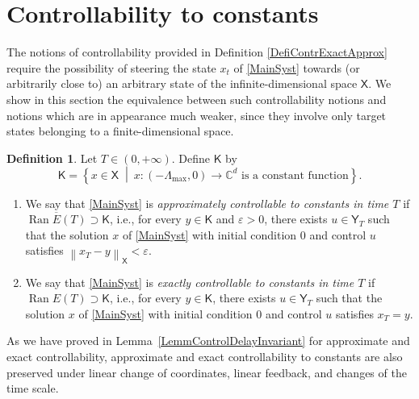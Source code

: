 \documentclass[10pt]{article}
\newcommand{\ie}{i.e.,\xspace}
\theoremstyle{plain}
\theoremstyle{definition}
\newtheorem{defi}[theo]{Definition}
\DeclareMathOperator{\range}{Ran}
\newcommand{\midsuchthat}{\;\middle|\:}
\newcommand{\norm}[1]{\left\lVert #1\right\lVert}
\numberwithin{equation}{section}\numberwithin{figure}{section}\emergencystretch=3em
\begin{document}
\section{Controllability to constants}
\label{SecContrConst}

The notions of controllability provided in Definition \ref{DefiContrExactApprox} require the possibility of steering the state $x_t$ of \eqref{MainSyst} towards (or arbitrarily close to) an arbitrary state of the infinite-dimensional space $\mathsf X$. We show in this section the equivalence between such controllability notions and notions which are in appearance much weaker, since they involve only target states belonging to a finite-dimensional space.

\begin{defi}
\label{DefiControlToCst}
Let $T \in (0, +\infty)$.
Define $\mathsf K$ by
\begin{equation}
\label{DefMathsfK}
\mathsf K = \left\{x \in \mathsf X \midsuchthat x: (-\Lambda_{\max}, 0) \rightarrow \mathbb C^d \text{ is a constant function}\right\}.
\end{equation}

\begin{enumerate}
\item We say that \eqref{MainSyst} is \emph{approximately controllable to constants in time $T$} if $\overline{\range E(T)} \supset \mathsf K$, \ie for every $y \in \mathsf K$ and $\varepsilon > 0$, there exists $u \in \mathsf Y_T$ such that the solution $x$ of \eqref{MainSyst} with initial condition $0$ and control $u$ satisfies $\norm{x_T - y}_{\mathsf X} < \varepsilon$.

\item We say that \eqref{MainSyst} is \emph{exactly controllable to constants in time $T$} if $\range E(T) \supset \mathsf K$, \ie for every $y \in \mathsf K$, there exists $u \in \mathsf Y_T$ such that the solution $x$ of \eqref{MainSyst} with initial condition $0$ and control $u$ satisfies $x_T = y$.
\end{enumerate}
\end{defi}

As we have proved in Lemma~\ref{LemmControlDelayInvariant} for approximate and exact controllability, approx\-imate and exact controllability to constants are also preserved under linear change of coordinates, linear feedback, and changes of the time scale.
\end{document}
